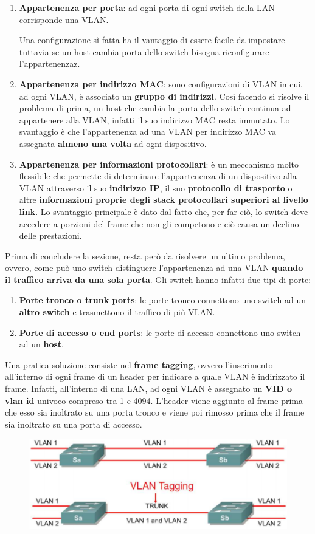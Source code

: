 \documentclass[11pt,a4paper,oneside]{book}
\theoremstyle{definition}
\begin{document}
\begin{enumerate}
	\item \textbf{Appartenenza per porta}: ad ogni porta di ogni switch della LAN corrisponde una VLAN. 
	
	\pagebreak 
	
	Una configurazione sì fatta ha il vantaggio di essere facile da  impostare tuttavia se un host cambia porta dello switch bisogna riconfigurare l'appartenenzaz.
	
	\item \textbf{Appartenenza per indirizzo MAC}: sono configurazioni di VLAN in cui, ad ogni VLAN, è associato un \textbf{gruppo di indirizzi}. Così facendo si risolve il problema di prima, un host che cambia la porta dello switch continua ad appartenere alla VLAN, infatti il suo indirizzo MAC resta immutato. Lo svantaggio è che l'appartenenza ad una VLAN per indirizzo MAC va assegnata \textbf{almeno una volta} ad ogni dispositivo.
	
	\item \textbf{Appartenenza per informazioni protocollari}: è un meccanismo molto flessibile che permette di determinare l'appartenenza di un dispositivo alla VLAN attraverso il suo \textbf{indirizzo IP}, il suo \textbf{protocollo di trasporto} o altre \textbf{informazioni proprie degli stack protocollari superiori al livello link}. Lo svantaggio principale è dato dal fatto che, per far ciò, lo switch deve accedere a porzioni del frame che non gli competono e ciò causa un declino delle prestazioni. 
\end{enumerate}

Prima di concludere la sezione, resta però da risolvere un ultimo problema, ovvero, come può uno switch distinguere l'appartenenza ad una VLAN \textbf{quando il traffico arriva da una sola porta}. Gli switch hanno infatti due tipi di porte: 

\begin{enumerate}
	\item \textbf{Porte tronco o trunk ports}: le porte tronco connettono uno switch ad un \textbf{altro switch} e trasmettono il traffico di più VLAN.
	\item \textbf{Porte di accesso o end ports}: le porte di accesso connettono uno switch ad un \textbf{host}.
\end{enumerate}

Una pratica soluzione consiste nel \textbf{frame tagging}, ovvero l'inserimento all'interno di ogni frame di un header per indicare a quale VLAN è indirizzato il frame. Infatti, all'interno di una LAN, ad ogni VLAN è assegnato un \textbf{VID o vlan id} univoco compreso tra 1 e 4094. L'header viene aggiunto al frame prima che esso sia inoltrato su una porta tronco e viene poi rimosso prima che il frame sia inoltrato su una porta di accesso.

\begin{figure}[!h]
	\includegraphics[scale=0.28]{Immagini/Vlan_tagging.png}
	\centering
\end{figure}

\pagebreak
\end{document}
